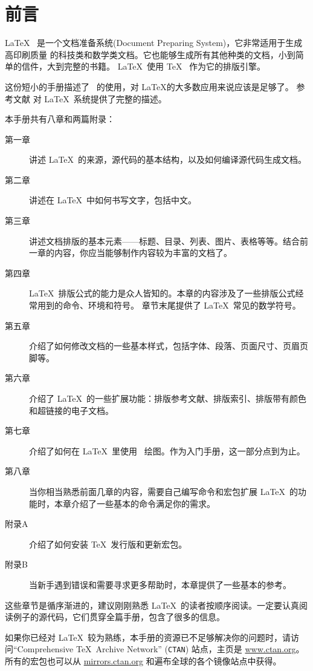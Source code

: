 \chapter{前言}

\LaTeX\ \cite{manual} 是一个文档准备系统(Document Preparing System)，它非常适用于生成高印刷质量
的科技类和数学类文档。它也能够生成所有其他种类的文档，小到简单的信件，大到完整的书籍。
\LaTeX~使用 \TeX\ \cite{texbook} 作为它的排版引擎。%

这份短小的手册描述了 \LaTeXe\ 的使用，对 \LaTeX 的大多数应用来说应该是足够了。
参考文献 \cite{manual,companion} 对 \LaTeX\ 系统提供了完整的描述。%

\bigskip
本手册共有八章和两篇附录：%
\begin{description}%
\item[第一章] 讲述 \LaTeX\ 的来源，源代码的基本结构，以及如何编译源代码生成文档。
\item[第二章] 讲述在 \LaTeX\ 中如何书写文字，包括中文。%
\item[第三章] 讲述文档排版的基本元素——标题、目录、列表、图片、表格等等。结合前一章的内容，你应当能够制作内容较为丰富的文档了。%
\item[第四章] \LaTeX\ 排版公式的能力是众人皆知的。本章的内容涉及了一些排版公式经常用到的命令、环境和符号。
              章节末尾提供了 \LaTeX\ 常见的数学符号。%
\item[第五章] 介绍了如何修改文档的一些基本样式，包括字体、段落、页面尺寸、页眉页脚等。
\item[第六章] 介绍了 \LaTeX\ 的一些扩展功能：排版参考文献、排版索引、排版带有颜色和超链接的电子文档。
\item[第七章] 介绍了如何在 \LaTeX\ 里使用 \TikZ\ 绘图。作为入门手册，这一部分点到为止。
\item[第八章] 当你相当熟悉前面几章的内容，需要自己编写命令和宏包扩展 \LaTeX\ 的功能时，本章介绍了一些基本的命令满足你的需求。
\end{description}%
\begin{description}
\item[附录A] 介绍了如何安装 \TeX\ 发行版和更新宏包。
\item[附录B] 当新手遇到错误和需要寻求更多帮助时，本章提供了一些基本的参考。
\end{description}

\bigskip
这些章节是循序渐进的，建议刚刚熟悉 \LaTeX\ 的读者按顺序阅读。一定要认真阅读例子的源代码，它们贯穿全篇手册，包含了很多的信息。%

\bigskip
如果你已经对 \LaTeX\ 较为熟练，本手册的资源已不足够解决你的问题时，请访问``Comprehensive
\TeX\ Archive Network'' (\texttt{CTAN}) 站点，主页是 \url{www.ctan.org}。
所有的宏包也可以从 \url{mirrors.ctan.org} 和遍布全球的各个镜像站点中获得。

